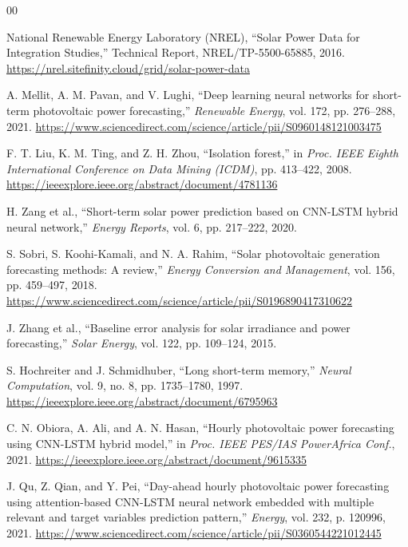 \documentclass[conference]{IEEEtran}
\begin{document}
\begin{thebibliography}{00}

 National Renewable Energy Laboratory (NREL), ``Solar Power Data for Integration Studies,'' Technical Report, NREL/TP-5500-65885, 2016. \url{https://nrel.sitefinity.cloud/grid/solar-power-data}

 A. Mellit, A. M. Pavan, and V. Lughi, ``Deep learning neural networks for short-term photovoltaic power forecasting,'' \textit{Renewable Energy}, vol. 172, pp. 276--288, 2021. \url{https://www.sciencedirect.com/science/article/pii/S0960148121003475}

 F. T. Liu, K. M. Ting, and Z. H. Zhou, ``Isolation forest,'' in \textit{Proc. IEEE Eighth International Conference on Data Mining (ICDM)}, pp. 413--422, 2008.
\url{https://ieeexplore.ieee.org/abstract/document/4781136}

 H. Zang et al., ``Short-term solar power prediction based on CNN-LSTM hybrid neural network,'' \textit{Energy Reports}, vol. 6, pp. 217--222, 2020.

 S. Sobri, S. Koohi-Kamali, and N. A. Rahim, ``Solar photovoltaic generation forecasting methods: A review,'' \textit{Energy Conversion and Management}, vol. 156, pp. 459--497, 2018. \url{https://www.sciencedirect.com/science/article/pii/S0196890417310622}

 J. Zhang et al., ``Baseline error analysis for solar irradiance and power forecasting,'' \textit{Solar Energy}, vol. 122, pp. 109--124, 2015.

 S. Hochreiter and J. Schmidhuber, ``Long short-term memory,'' \textit{Neural Computation}, vol. 9, no. 8, pp. 1735--1780, 1997. \url{https://ieeexplore.ieee.org/abstract/document/6795963}

 C. N. Obiora, A. Ali, and A. N. Hasan, ``Hourly photovoltaic power forecasting using CNN-LSTM hybrid model,'' in \textit{Proc. IEEE PES/IAS PowerAfrica Conf.}, 2021. \url{https://ieeexplore.ieee.org/abstract/document/9615335}

 J. Qu, Z. Qian, and Y. Pei, ``Day-ahead hourly photovoltaic power forecasting using attention-based CNN-LSTM neural network embedded with multiple relevant and target variables prediction pattern,'' \textit{Energy}, vol. 232, p. 120996, 2021. \url{https://www.sciencedirect.com/science/article/pii/S0360544221012445}


\end{thebibliography}
\end{document}
